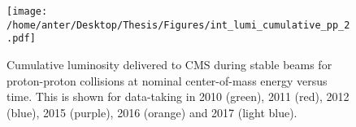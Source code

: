 \begin{figure}[!h]
 \begin{center} 
 \texttt{[image: /home/anter/Desktop/Thesis/Figures/int\_lumi\_cumulative\_pp\_2.pdf]}\\
 \vspace*{5mm}
 \caption[Lumi]{Cumulative luminosity delivered to CMS during stable beams for proton-proton collisions at nominal center-of-mass energy versus time. This is shown for data-taking in 2010 (green), 2011 (red), 2012 (blue), 2015 (purple), 2016 (orange) and 2017 (light blue).\footnotemark}
 \label{fig:LHC}
 \end{center}
\end{figure}

\begin{comment}
\section{The Compact Muon Solenoid}
The CMS (Compact Muon Solenoid) detector is a multilayered cylinder which is 21 m long, 15 m wide and 15 m high weighing 12,500 tonnes, as shown in Figure \ref{CMS}. The CMS detector aims at identifying the different types of particles produced in the collisions and measuring their energies and momenta. This goal cannot be fulfilled by a single device. So several sub-detectors are arranged to form a complex apparatus which are discussed in brief as below :
\begin{figure}[h!]
\begin{flushright}
\hspace{15mm}
\texttt{[image: thesis/figs/Detector/CMS1.jpg]}
\caption{Overview of the CMS (Compact Muon Solenoid) Detector}
\label{CMS}
\end{flushright}
\end{figure}


\end{comment}
